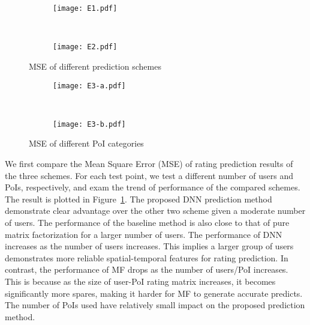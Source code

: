 \begin{figure}[ht]%
        \centering
        \begin{subfigure}{0.25\textwidth}
               \texttt{[image: E1.pdf]}
        \end{subfigure}%
        ~ %
        \begin{subfigure}{0.25\textwidth}
                \texttt{[image: E2.pdf]}
        \end{subfigure}
         \caption{MSE of different prediction schemes}\label{E12}
         \vspace{-2mm}
\end{figure}

\begin{figure}[htb]%
        \centering
        \begin{subfigure}{0.25\textwidth}
               \texttt{[image: E3-a.pdf]}
        \end{subfigure}%
        ~ %
        \begin{subfigure}{0.25\textwidth}
                \texttt{[image: E3-b.pdf]}
        \end{subfigure}
         \caption{MSE of different PoI categories}\label{E3}
         \vspace{-2mm}
\end{figure}

We first compare the Mean Square Error (MSE) of rating prediction results of the three schemes. For each test point, we test a different number of users and PoIs, respectively, and exam the trend of performance of the compared schemes. The result is plotted in Figure~\ref{E12}. The proposed DNN prediction method demonstrate clear advantage over the other two scheme given a moderate number of users. The performance of the baseline method is also close to that of pure matrix factorization for a larger number of users. The performance of DNN increases as the number of users increases. This implies a larger group of users demonstrates more reliable spatial-temporal features for rating prediction. In contrast, the performance of MF drops as the number of users/PoI increases. This is because as the size of user-PoI rating matrix increases, it becomes significantly more spares, making it harder for MF to generate accurate predicts. The number of PoIs used have relatively small impact on the proposed prediction method.


